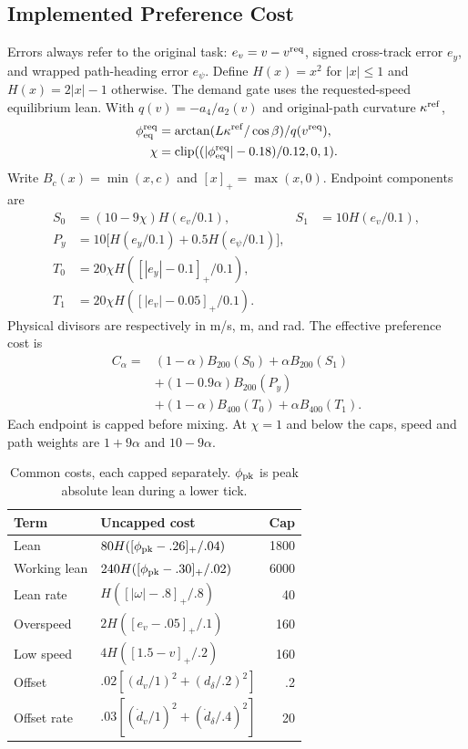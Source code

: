 \documentclass[journal]{IEEEtran}
\newcommand{\clip}{\operatorname{clip}}\newcommand{\sat}{\operatorname{sat}}
\begin{document}
\subsection{Implemented Preference Cost}
Errors always refer to the original task: $e_v=v-v^{\rm req}$, signed cross-track error $e_y$, and wrapped path-heading error $e_\psi$. Define $H(x)=x^2$ for $|x|\leq1$ and $H(x)=2|x|-1$ otherwise. The demand gate uses the requested-speed equilibrium lean. With $q(v)=-a_4/a_2(v)$ and original-path curvature $\kappa^{\rm ref}$,
\begin{equation}
\begin{split}
 \phi^{\rm req}_{\rm eq}&=\arctan(L\kappa^{\rm ref}/\cos\beta)/q(v^{\rm req}),\\
 \chi&=\clip((|\phi^{\rm req}_{\rm eq}|-0.18)/0.12,0,1).
\end{split}
 \label{eq:gate}
\end{equation}
Write $B_c(x)=\min(x,c)$ and $[x]_+=\max(x,0)$. Endpoint components are
\begin{align}
 S_0&=(10-9\chi)H(e_v/0.1),&S_1&=10H(e_v/0.1),\nonumber\\
 P_y&=10\big[H(e_y/0.1)+0.5H(e_\psi/0.1)\big],\nonumber\\
 T_0&=20\chi H([|e_y|-0.1]_+/0.1),\nonumber\\
 T_1&=20\chi H([|e_v|-0.05]_+/0.1).
 \label{eq:endpoints}
\end{align}
Physical divisors are respectively in m/s, m, and rad. The effective preference cost is
\begin{equation}
\begin{split}
 C_\alpha={}&(1-\alpha)B_{200}(S_0)+\alpha B_{200}(S_1)\\
 &+(1-0.9\alpha)B_{200}(P_y)\\
 &+(1-\alpha)B_{400}(T_0)+\alpha B_{400}(T_1).
\end{split}\label{eq:prefcost}
\end{equation}
Each endpoint is capped before mixing. At $\chi=1$ and below the caps, speed and path weights are $1+9\alpha$ and $10-9\alpha$.

\begin{table}[t]\centering\footnotesize
\caption{Common costs, each capped separately. $\phi_{\rm pk}$ is peak absolute lean during a lower tick.}\label{tab:common}
\begin{tabular}{@{}p{18mm}p{48mm}r@{}}\toprule
Term & Uncapped cost & Cap\\\midrule
Lean & $80H([\phi_{\rm pk}-.26]_+/.04)$ & 1800\\
Working lean & $240H([\phi_{\rm pk}-.30]_+/.02)$ & 6000\\
Lean rate & $H([|\omega|-.8]_+/.8)$ & 40\\
Overspeed & $2H([e_v-.05]_+/.1)$ & 160\\
Low speed & $4H([1.5-v]_+/.2)$ & 160\\
Offset & $.02[(d_v/1)^2+(d_\delta/.2)^2]$ & .2\\
Offset rate & $.03[(\dot d_v/1)^2+(\dot d_\delta/.4)^2]$ & 20\\\bottomrule
\end{tabular}
\end{table}
\end{document}
